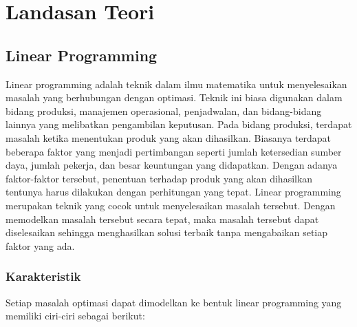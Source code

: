 \chapter{Landasan Teori}
\label{chap:teori}

\section{Linear Programming}
\label{linear_programming}

Linear programming adalah teknik dalam ilmu matematika untuk menyelesaikan masalah yang berhubungan dengan optimasi. Teknik ini biasa digunakan dalam bidang produksi, manajemen operasional, penjadwalan, dan bidang-bidang lainnya yang melibatkan pengambilan keputusan. Pada bidang produksi, terdapat masalah ketika menentukan produk yang akan dihasilkan. Biasanya terdapat beberapa faktor yang menjadi pertimbangan seperti jumlah ketersedian sumber daya, jumlah pekerja, dan besar keuntungan yang didapatkan. Dengan adanya faktor-faktor tersebut, penentuan terhadap produk yang akan dihasilkan tentunya harus dilakukan dengan perhitungan yang tepat. Linear programming merupakan teknik yang cocok untuk menyelesaikan masalah tersebut. Dengan memodelkan masalah tersebut secara tepat, maka masalah tersebut dapat diselesaikan sehingga menghasilkan solusi terbaik tanpa mengabaikan setiap faktor yang ada.

\subsection{Karakteristik}
\label{karakteristik}

Setiap masalah optimasi dapat dimodelkan ke bentuk linear programming yang memiliki ciri-ciri sebagai berikut:

